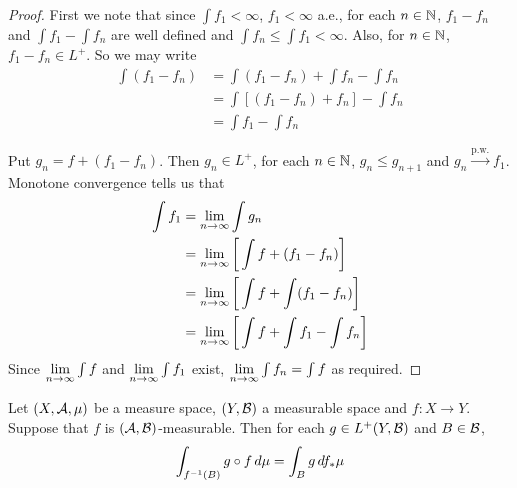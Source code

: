 \documentclass{book}
\begin{document}
	\begin{proof}
		First we note that since $\int f_1 < \infty$, $f_1 < \infty$ a.e., for each $n \in \mathbb{N}$, $f_1 - f_n$ and $\int f_1 - \int f_n$ are well defined and $\int f_n \leq \int f_1 < \infty$. Also, for $n \in \mathbb{N}$, $f_1 -f_n \in L^+$. So we may write 
		\begin{align*}
			\int (f_1 - f_n) 
			&= \int (f_1 - f_n)  + \int f_n - \int f_n\\
			&= \int [(f_1 - f_n) + f_n] - \int f_n\\
			&= \int f_1 - \int f_n
		\end{align*}
		
		Put $g_n = f + (f_1 - f_n)$. Then $g_n \in L^+$, for each $n \in \mathbb{N}$, $g_n \leq g_{n+1}$ and $g_n \xrightarrow{\text{p.w.}} f_1$. Monotone convergence tells us that 
		\begin{align*}
			\int f_1 
			&= \lim \limits_{n \rightarrow \infty} \int g_n\\
			&= \lim \limits_{n \rightarrow \infty} \bigg[\int f + (f_1-f_n)\bigg]\\
			&= \lim \limits_{n \rightarrow \infty} \bigg[ \int f + \int (f_1-f_n)\bigg] \\
			&= \lim \limits_{n \rightarrow \infty} \bigg[ \int f + \int f_1- \int f_n\bigg] 
		\end{align*}
		Since $\lim \limits_{n \rightarrow \infty} \int f$ and $\lim \limits_{n \rightarrow \infty} \int f_1$ exist, $\lim \limits_{n \rightarrow \infty} \int f_n = \int f$ as required.  
	\end{proof}


	\begin{ex} 
		Let $(X, \mathcal{A}, \mu)$ be a measure space, $(Y, \mathcal{B})$ a measurable space and $f: X \rightarrow Y$. Suppose that $f$ is $(\mathcal{A}, \mathcal{B})$-measurable. Then for each $g \in L^+(Y, \mathcal{B})$ and $B \in \mathcal{B}$, 
		$$\int_{f^{-1}(B)} g \circ f \, d \mu = \int_B g \, d f_*\mu$$
	\end{ex}
\end{document}
